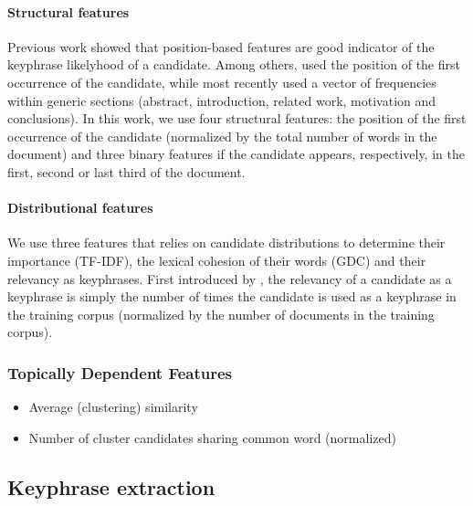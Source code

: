       \paragraph{Structural features} Previous work showed that position-based
      features are good indicator of the keyphrase likelyhood of a candidate.
      Among others,  used the position of the
      first occurrence of the candidate, while most recently
       used a vector of frequencies
      within generic sections (abstract, introduction, related work, motivation
      and conclusions). In this work, we use four structural features: the
      position of the first occurrence of the candidate (normalized by the total
      number of words in the document) and three binary features if the
      candidate appears, respectively, in the first, second or last third of the
      document.

      \paragraph{Distributional features} We use three features that relies on
      candidate distributions to determine their importance (TF-IDF), the
      lexical cohesion of their words  (GDC) and their
      relevancy as keyphrases. First introduced by
      , the relevancy of a candidate as a
      keyphrase is simply the number of times the candidate is used as a
      keyphrase in the training corpus (normalized by the number of documents in
      the training corpus).

    \subsubsection{Topically Dependent Features}
    \label{subsubsec:topically_dependent_features}
      \begin{itemize}
        \item{Average (clustering) similarity}
        \item{Number of cluster candidates sharing common word (normalized)}
      \end{itemize}

  \subsection{Keyphrase extraction}
  \label{subsec:keyphrase_extraction}

